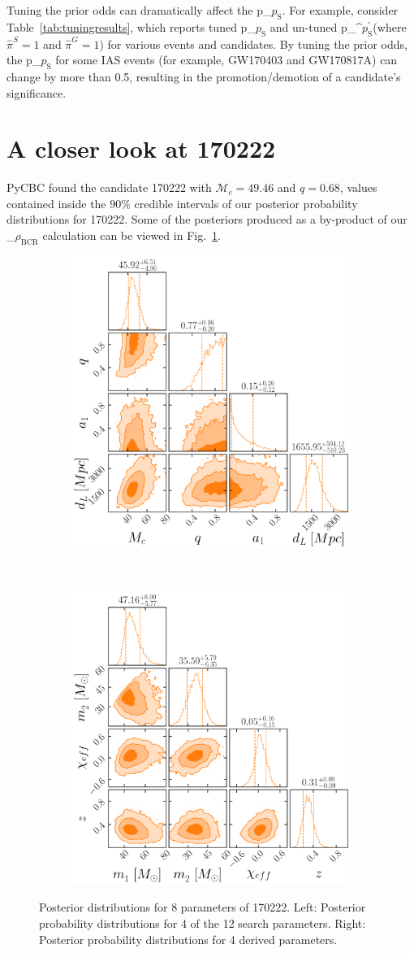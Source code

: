 \documentclass[
 nofootinbib,
 amsmath,amssymb,
 aps,
 twocolumn,
 superscriptaddress
]{revtex4-2}
\newcommand{\fancytext}[1]{{\relax\ifmmode#1\else $#1$\fi}\xspace}
\newcommand{\mathcmd}[1]{{\sc \relax\ifmmode#1\else $#1$\fi}\xspace}
\newcommand{\bcr}{\mathcmd{\rho_\text{BCR}}}
\newcommand{\pastrobcr}{\fancytext{p_\text{S}}}
\newcommand{\untunedpastrobcr}{\fancytext{p_\text{S}^{\prime}}}
\begin{document}
Tuning the prior odds can dramatically affect the \pastrobcr. For example, consider Table~\ref{tab:tuningresults}, which reports tuned \pastrobcr and un-tuned \untunedpastrobcr (where $\hat{\pi}^S=1$ and $\hat{\pi}^G=1$) for various events and candidates. By tuning the prior odds, the \pastrobcr for some IAS events (for example, GW170403 and GW170817A) can change by more than 0.5, resulting in the promotion/demotion of a candidate's significance.





\section{A closer look at 170222}\label{apdx:170222}
PyCBC found the candidate 170222 with $\mathcal{M}_c=49.46$ and $q=0.68$, values contained inside the $90\%$ credible intervals of our posterior probability distributions for 170222. Some of the posteriors produced as a by-product of our \bcr calculation can be viewed in Fig.~\ref{fig:170222}.

\begin{figure}
    \centering
    \begin{subfigure}
        \centering
        \includegraphics[width=0.45\linewidth]{170222_prior_posterior.png}
    \end{subfigure}
    ~ 
    \begin{subfigure}
        \centering
        \includegraphics[width=0.45\linewidth]{170222_source_posterior.png}
    \end{subfigure}
    \caption{Posterior distributions for 8 parameters of 170222. 
    Left: Posterior probability distributions for 4 of the 12 search parameters.
    Right: Posterior probability distributions for 4 derived parameters.
    \label{fig:170222}}
\end{figure}






\end{document}

